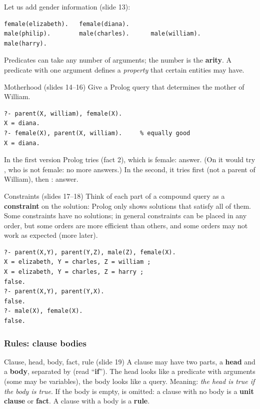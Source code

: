 Let us add gender information (slide 13):
\begin{verbatim}
female(elizabeth).   female(diana).
male(philip).        male(charles).      male(william).     male(harry).
\end{verbatim}
Predicates can take any number of arguments; the number is the \textbf{arity}. A predicate
with one argument defines a \emph{property} that certain entities may have.

\begin{nbexample}{Motherhood (slides 14--16)}
Give a Prolog query that determines the mother of William.
\begin{verbatim}
?- parent(X, william), female(X).
X = diana.
?- female(X), parent(X, william).     % equally good
X = diana.
\end{verbatim}
In the first version Prolog tries  (fact 2), which is female: answer. (On
\code{;} it would try , who is not female: no more answers.) In the
second, it tries  first (not a parent of William), then
: answer.
\end{nbexample}

\begin{nbfact}{Constraints (slides 17--18)}
Think of each part of a compound query as a \textbf{constraint} on the solution: Prolog only
shows solutions that satisfy all of them. Some constraints have no solutions; in general
constraints can be placed in any order, but some orders are more efficient than others, and
some orders may not work as expected (more later).
\begin{verbatim}
?- parent(X,Y), parent(Y,Z), male(Z), female(X).
X = elizabeth, Y = charles, Z = william ;
X = elizabeth, Y = charles, Z = harry ;
false.
?- parent(X,Y), parent(Y,X).
false.
?- male(X), female(X).
false.
\end{verbatim}
\end{nbfact}

\subsubsection{Rules: clause bodies}

\begin{nbdef}{Clause, head, body, fact, rule (slide 19)}
A clause may have two parts, a \textbf{head} and a \textbf{body}, separated by \code{:-}
(read ``\textbf{if}''). The head looks like a predicate with arguments (some may be
variables), the body looks like a query. Meaning: \emph{the head is true if the body is
true}. If the body is empty, \code{:-} is omitted: a clause with no body is a \textbf{unit
clause} or \textbf{fact}. A clause with a body is a \textbf{rule}.
\end{nbdef}

